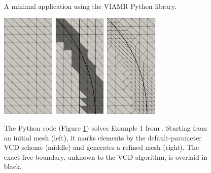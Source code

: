 \documentclass[]{interact}
\theoremstyle{plain}%
\theoremstyle{definition}
\theoremstyle{remark}
\begin{document}
\begin{figure}[ht]
\inputminted[linenos, frame=lines]{python}{static/exampleAOL.py}
\caption{A minimal application using the VIAMR Python library.}
\label{fig:exampleAOL}
\end{figure}

\begin{figure}[ht]
\centering
\mbox{\includegraphics[width=0.23\textwidth]{static/aol-mesh0.png} \qquad\quad
\includegraphics[width=0.23\textwidth]{static/aol-marked.png} \qquad\quad
\includegraphics[width=0.23\textwidth]{static/aol-mesh1.png}}
\caption{The Python code (Figure \ref{fig:exampleAOL}) solves Example 1 from \cite{AinsworthOdenLee1993}.  Starting from an initial mesh (left), it marks elements by the default-parameter VCD scheme (middle) and generates a refined mesh (right).  The exact free boundary, unknown to the VCD algorithm, is overlaid in black.}
\label{fig:resultAOL}
\end{figure}
\end{document}
